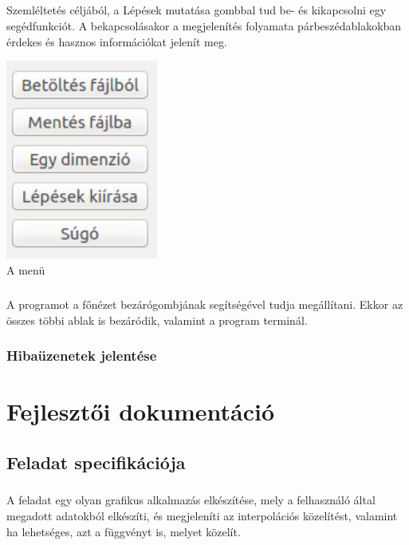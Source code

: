 \documentclass[12pt]{report}
\begin{document}
\paragraph{}
Szemléltetés céljából, a Lépések mutatása gombbal tud be- és kikapcsolni egy segédfunkciót. A bekapcsolásakor a megjelenítés folyamata párbeszédablakokban érdekes és hasznos információkat jelenít meg.
\begin{center}
\includegraphics[width=5cm]{pics/gui/menu}  \\
{\footnotesize A menü} 
\end{center}
\paragraph{}
A programot a főnézet bezárógombjának segítségével tudja megállítani. Ekkor az összes többi ablak is bezáródik, valamint a program terminál.
\subsection{Hibaüzenetek jelentése}

\chapter{Fejlesztői dokumentáció}

\section{Feladat specifikációja}
\paragraph{}
A feladat egy olyan grafikus alkalmazás elkészítése, mely a felhasználó által megadott adatokból elkészíti, és megjeleníti az interpolációs közelítést, valamint ha lehetséges, azt a függvényt is, melyet közelít.
\end{document}

